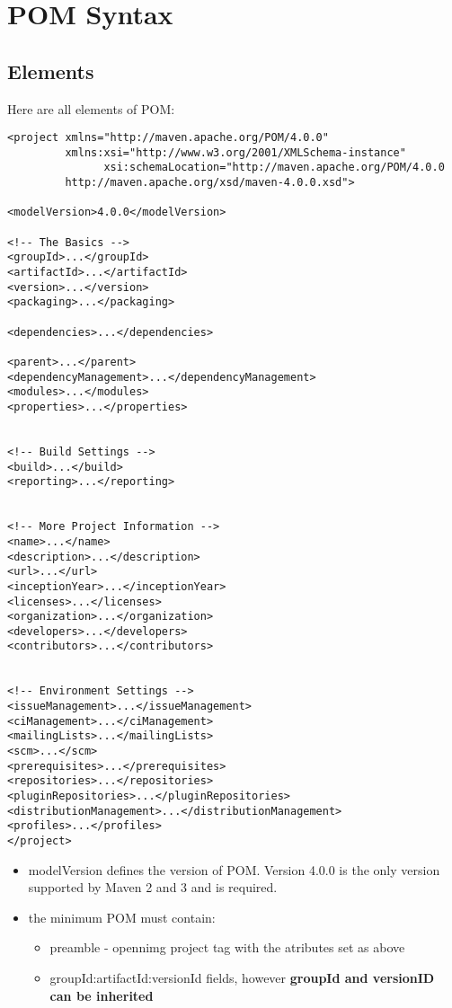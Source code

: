 \documentclass{report}
\begin{document}
\chapter{POM Syntax}


\section{Elements}

Here are all elements of POM:
\begin{verbatim}
<project xmlns="http://maven.apache.org/POM/4.0.0"
         xmlns:xsi="http://www.w3.org/2001/XMLSchema-instance"
               xsi:schemaLocation="http://maven.apache.org/POM/4.0.0
         http://maven.apache.org/xsd/maven-4.0.0.xsd">

<modelVersion>4.0.0</modelVersion>

<!-- The Basics -->
<groupId>...</groupId>
<artifactId>...</artifactId>
<version>...</version>
<packaging>...</packaging>

<dependencies>...</dependencies>

<parent>...</parent>
<dependencyManagement>...</dependencyManagement>
<modules>...</modules>
<properties>...</properties>


<!-- Build Settings -->
<build>...</build>
<reporting>...</reporting>


<!-- More Project Information -->
<name>...</name>
<description>...</description>
<url>...</url>
<inceptionYear>...</inceptionYear>
<licenses>...</licenses>
<organization>...</organization>
<developers>...</developers>
<contributors>...</contributors>


<!-- Environment Settings -->
<issueManagement>...</issueManagement>
<ciManagement>...</ciManagement>
<mailingLists>...</mailingLists>
<scm>...</scm>
<prerequisites>...</prerequisites>
<repositories>...</repositories>
<pluginRepositories>...</pluginRepositories>
<distributionManagement>...</distributionManagement>
<profiles>...</profiles>
</project>
\end{verbatim}

\begin{itemize}
	\item modelVersion defines the version of POM. Version 4.0.0 is the only version supported by Maven 2 and 3 and is required.
	\item the minimum POM must contain:
	\begin{itemize}
		\item preamble - opennimg project tag with the atributes set as above
		\item groupId:artifactId:versionId fields, however \textbf{groupId and versionID can be inherited}
	\end{itemize}
\end{itemize}
\end{document}
